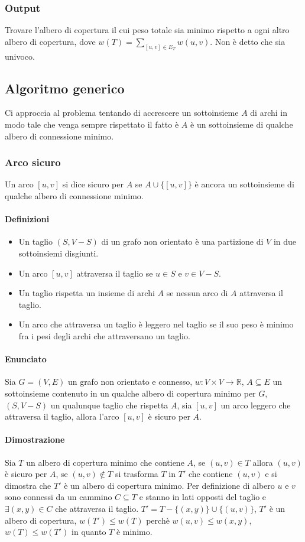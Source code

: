\subsubsection{Output}
Trovare l'albero di copertura il cui peso totale sia minimo rispetto a ogni altro albero di copertura, dove $w(T)=\sum\limits_{[u, v]\in E_T} w(u, v)$. Non \`e detto che sia univoco.
\subsection{Algoritmo generico}
Ci approccia al problema tentando di accrescere un sottoinsieme $A$ di archi in modo tale che venga sempre rispettato il fatto \`e $A$ \`e un sottoinsieme di qualche albero di 
connessione minimo.
\subsubsection{Arco sicuro}
Un arco $[u, v]$ si dice sicuro per $A$ se $A\cup\{[u, v]\}$ \`e ancora un sottoinsieme di qualche albero di connessione minimo.\\

\paragraph{Definizioni}
\begin{itemize}
	\item Un taglio $(S, V - S)$ di un grafo non orientato \`e una partizione di $V$ in due sottoinsiemi disgiunti.
	\item Un arco $[u, v]$ attraversa il taglio se $u\in S$ e $v\in V-S$.
	\item Un taglio rispetta un insieme di archi $A$ se nessun arco di $A$ attraversa il taglio.
	\item Un arco che attraversa un taglio \`e leggero nel taglio se il suo peso \`e minimo fra i pesi degli archi che attraversano un taglio.
\end{itemize}
\paragraph{Enunciato}
Sia $G=(V, E)$ un grafo non orientato e connesso, $w:V\times V\rightarrow\mathbb{R}$, $A\subseteq E$ un sottoinsieme contenuto in un qualche albero di copertura minimo per $G$, 
$(S, V-S)$ un qualunque taglio che rispetta $A$, sia $[u, v]$ un arco leggero che attraversa il taglio, allora l'arco $[u, v]$ \`e sicuro per $A$. 
\paragraph{Dimostrazione}
Sia $T$ un albero di copertura minimo che contiene $A$, se $(u, v)\in T$ allora $(u, v)$ \`e sicuro per $A$, se $(u, v)\not\in T$ si trasforma $T$ in $T'$ che contiene $(u, v)$ e si 
dimostra che $T'$ \`e un albero di copertura minimo. Per definizione di albero $u$ e $v$ sono connessi da un cammino $C\subseteq T$ e stanno in lati opposti del taglio e $\exists(x, y)
\in C$ che attraversa il taglio. $T'=T-\{(x, y)\}\cup\{(u, v)\}$, $T'$ \`e un albero di copertura, $w(T')\le w(T)$ perch\`e $w(u, v)\le w(x, y)$, $w(T)\le w(T')$ in quanto $T$ \`e 
minimo.
